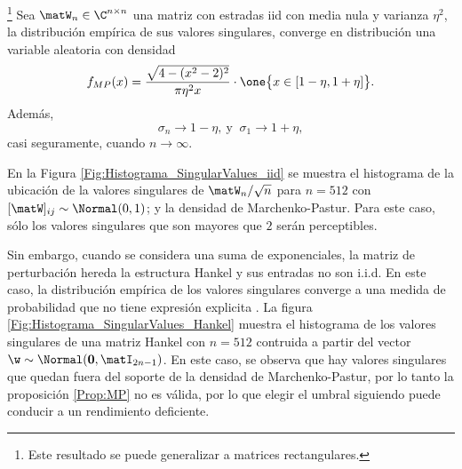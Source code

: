 \begin{prop}\footnote{Este resultado se puede generalizar a matrices rectangulares.}\label{Prop:MP}
	Sea $\matW_n\in\C^{n\times n}$ una matriz con estradas iid con media nula y varianza $\eta^2$, la distribución empírica de sus valores singulares, converge en distribución una variable aleatoria con densidad
	\begin{equation}
		f_{MP}(x) = \frac{\sqrt{4-(x^2-2)^2}}{\pi \eta^2 x}\cdot\one\big\{x\in[1-\eta,1+\eta]\big\}.
		\label{Eq:MPDensity}
	\end{equation}
	Además,
	\begin{equation}
		\sigma_n \to 1-\eta, \ \text{y } \ 
		\sigma_1 \to 1+\eta, 
	\end{equation}
	casi seguramente, cuando $n\to \infty$.
\end{prop} 



En la Figura \ref{Fig:Histograma_SingularValues_iid} se muestra el histograma de la ubicación de la valores singulares de $\matW_n/\sqrt{n}$ para $n=512$ con $[\matW]_{ij}\sim\Normal(0,1)$; y la densidad de Marchenko-Pastur. Para este caso, sólo los valores singulares que son mayores que $2$ serán perceptibles.

	
	Sin embargo, cuando se considera una suma de exponenciales, la matriz de perturbación hereda la estructura Hankel y sus entradas no son i.i.d. En este caso, la distribución empírica de los valores singulares converge a una medida de probabilidad que no tiene expresión explicita \cite{Bryc2006}. La figura \ref{Fig:Histograma_SingularValues_Hankel} muestra el histograma de los valores singulares de una matriz Hankel con $n=512$ contruida a partir del vector $\w\sim\Normal(\mathbf{0},\matI_{2n-1})$. En este caso, se observa que hay valores singulares que quedan fuera del soporte de la densidad de Marchenko-Pastur, por lo tanto la proposición \eqref{Prop:MP} no es válida, por lo que elegir el umbral siguiendo \cite{Gavish2014} puede conducir a un rendimiento deficiente. 
	
